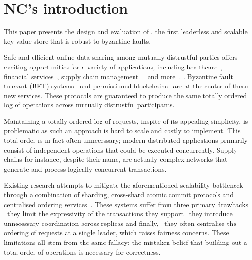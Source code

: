 \section{NC's introduction}

This paper presents the design and evaluation of \sys{}, the
first leaderless and scalable key-value store that is robust
to byzantine faults.

Safe and efficient online data sharing among mutually distrustful
parties offers exciting opportunities for a variety of applications,
including healthcare~\cite{}, financial services~\cite{}, supply chain
management~~\cite{} and more~\cite{}. . Byzantine fault tolerant (BFT)
systems~\cite{castro1999practical, martin2006fast, kotla2007zyzzyva,  gueta2018sbft, clement2009making, buchman2016tendermint, yin2019hotstuff, Clement09Upright, duan2014hbft    , pires2018generalized, bessani2014state, lamport2011byzantizing, arun2019ezbft, malkhi2019flexible, duan2014hbft, yin2003separating, Guerraoui08Next, Kotla04High,  liskov2010viewstamped} and permissioned blockchains~\cite{Hyperledger, EthereumQuorum, buchman2016tendermint, al2017chainspace, kokoris2018omniledger,  gilad2017algorand, baudet2019state} are at the center of these new services. These protocols are guaranteed to
produce the same totally ordered log of operations across mutually distrustful
participants. 

Maintaining a totally ordered log of requests, inspite of its appealing simplicity, is problematic as such an approach is hard to scale and costly to implement. This total order is in fact often unnecessary; modern distributed applications primarily consist of independent operations that could be executed concurrently. Supply chains for instance, despite their name, are actually complex networks that generate and process logically concurrent transactions.

Existing research attempts to mitigate the aforementioned scalability bottleneck through a combination of sharding, cross-shard atomic commit protocols and centralised ordering services~\cite{kokoris2019omniledger,al2017chainspace,padilha2016callinicos}. These systems suffer from three primary drawbacks \one~they limit the expressivity of the transactions they support \two~they introduce unnecessary coordination across replicas and finally,
\three~they often centralise the ordering of requests at a single leader, which raises fairness concerns. These limitations all stem from the same fallacy: the mistaken belief that building out a total order of operations is necessary for correctness.
 
